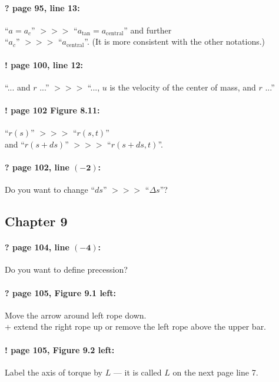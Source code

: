 \documentclass[twoside]{article}
\begin{document}
\paragraph{? page 95, line 13:} ``$a=a_c$'' $>\!>\!>$ ``$a_{\mathrm{tan}}=a_{\mathrm{central}}$'' and further\\
``$a_c$'' $>\!>\!>$ ``$a_{\mathrm{central}}$''. (It is more consistent with the other notations.)

\paragraph{! page 100, line 12:} ``... and $r$ ...'' $>\!>\!>$ ``..., $u$ is the velocity of the center of mass, and $r$ ...''

\paragraph{! page 102 Figure 8.11:} ``$r(s)$'' $>\!>\!>$ ``$r(s,t)$''\\ and ``$r(s+ds)$'' $>\!>\!>$ ``$r(s+ds,t)$''.

\paragraph{? page 102, line $\bm{(-2)}$:} Do you want to change ``$ds$'' $>\!>\!>$ ``$\Delta s$''?

\subsection*{Chapter 9}

\paragraph{? page 104, line $\bm{(-4)}$:} Do you want to define precession?

\paragraph{? page 105, Figure 9.1 left:} Move the arrow around left rope down.
\\ + extend the right rope up or remove the left rope above the upper bar.

\paragraph{! page 105, Figure 9.2 left:} Label the axis of torque by $L$ --- it is called $L$ on the next page line 7.
\end{document}
